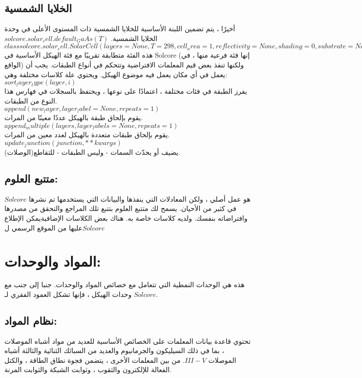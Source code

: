 \subsection{الخلايا الشمسية}
أخيرًا ، يتم تضمين اللبنة الأساسية للخلايا الشمسية ذات المستوى الأعلى في وحدة الخلايا الشمسية.
$ solcore.solar_cell.default_GaAs(T) $
$ class solcore.solar_cell.SolarCell(layers=None, T=298, cell_area=1, reflectivity=None, shading=0, substrate=None, incidence=None, R_series=0, **kwargs) $
هذه الفئة متطابقة تقريبًا مع فئة الهيكل الأساسية في Solcore (إنها فئة فرعية منها ، في الواقع) ولكنها تنفذ بعض قيم المعلمات الافتراضية وتتحكم في أنواع الطبقات. يجب أن يعمل في أي مكان يعمل فيه موضوع الهيكل.
ويحتوي علة كلاسات مختلفة وهي:
\\$ sort_layer_type(layer, i) $
\\يفرز الطبقة في فئات مختلفة ، اعتمادًا على نوعها ، ويحتفظ بالسجلات في فهارس هذا النوع من الطبقات.
\\$ append(new_layer, layer_label=None, repeats=1) $
\\يقوم بإلحاق طبقة بالهيكل عددًا معينًا من المرات.
\\$ append_multiple(layers, layer_labels=None, repeats=1) $
\\يقوم بإلحاق طبقات متعددة بالهيكل لعدد معين من المرات.
\\$ update_junction(junction, **kwargs) $
\\يضيف أو يحدّث السمات - وليس الطبقات - للتقاطع(الوصلات).
\subsection{متتبع العلوم:}
$ Solcore $ هو عمل أصلي ، ولكن المعادلات التي ينفذها والبيانات التي يستخدمها تم نشرها في كثير من الأحيان. يسمح لك متتبع العلوم بتتبع تلك المراجع والتحقق من مصدرها وافتراضاته بنفسك.
ولديه كلاسات خاصة به. هناك بعض الكلاسات الإضافيةيمكن الإطلاع عليها من الموقع الرسمي ل$ Solcore $
\section{المواد والوحدات: }
هذه هي الوحدات النمطية التي تتعامل مع خصائص المواد والوحدات. جنبا إلى جنب مع وحدات الهيكل ، فإنها تشكل العمود الفقري لـ $ Solcore $.
\subsection{نظام المواد:}
تحتوي قاعدة بيانات المعلمات على الخصائص الأساسية للعديد من مواد أشباه الموصلات ، بما في ذلك السيليكون والجرمانيوم والعديد من السبائك الثنائية والثالثة أشباه الموصلات $ III-V $. من بين المعلمات الأخرى ، يتضمن فجوة نطاق الطاقة ، والكتل الفعالة للإلكترون والثقوب ، وثوابت الشبكة والثوابت المرنة.

